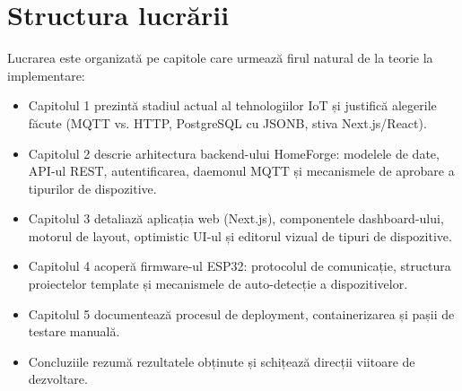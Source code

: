 \section*{Structura lucrării}
Lucrarea este organizată pe capitole care urmează firul natural de la teorie la implementare:
\begin{itemize}
    \item Capitolul 1 prezintă stadiul actual al tehnologiilor IoT și justifică alegerile făcute (MQTT vs. HTTP, PostgreSQL cu JSONB, stiva Next.js/React).
    \item Capitolul 2 descrie arhitectura backend-ului HomeForge: modelele de date, API-ul REST, autentificarea, daemonul MQTT și mecanismele de aprobare a tipurilor de dispozitive.
    \item Capitolul 3 detaliază aplicația web (Next.js), componentele dashboard-ului, motorul de layout, optimistic UI-ul și editorul vizual de tipuri de dispozitive.
    \item Capitolul 4 acoperă firmware-ul ESP32: protocolul de comunicație, structura proiectelor template și mecanismele de auto-detecție a dispozitivelor.
    \item Capitolul 5 documentează procesul de deployment, containerizarea și pașii de testare manuală.
    \item Concluziile rezumă rezultatele obținute și schițează direcții viitoare de dezvoltare.
\end{itemize}
